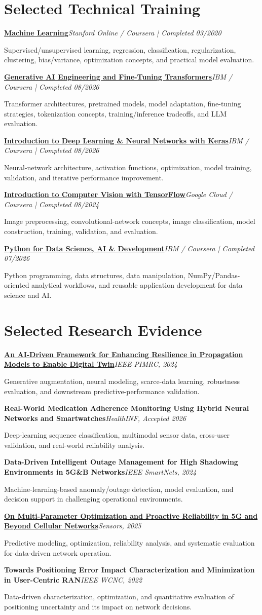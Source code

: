\documentclass[10pt,letterpaper]{extarticle}
\newcommand{\cert}[3]{\Needspace{2\baselineskip}\textbf{#1}\hfill\textit{#2}\par{\small #3\par}}
\newcommand{\pub}[3]{\Needspace{2\baselineskip}\textbf{#1}\hfill\textit{#2}\par{\small #3\par}}
\begin{document}
\section{Selected Technical Training}
\cert{\href{https://www.coursera.org/account/accomplishments/verify/VU3Y5TBLVLZT}{Machine Learning}}{Stanford Online / Coursera | Completed 03/2020}{Supervised/unsupervised learning, regression, classification, regularization, clustering, bias/variance, optimization concepts, and practical model evaluation.}
\cert{\href{https://www.coursera.org/account/accomplishments/verify/SG4GDJ4CLPVL}{Generative AI Engineering and Fine-Tuning Transformers}}{IBM / Coursera | Completed 08/2026}{Transformer architectures, pretrained models, model adaptation, fine-tuning strategies, tokenization concepts, training/inference tradeoffs, and LLM evaluation.}
\cert{\href{https://www.coursera.org/account/accomplishments/verify/Y6NP4GWLS4DZ}{Introduction to Deep Learning \& Neural Networks with Keras}}{IBM / Coursera | Completed 08/2026}{Neural-network architecture, activation functions, optimization, model training, validation, and iterative performance improvement.}
\cert{\href{https://www.coursera.org/account/accomplishments/verify/R6248BNQAC0D}{Introduction to Computer Vision with TensorFlow}}{Google Cloud / Coursera | Completed 08/2024}{Image preprocessing, convolutional-network concepts, image classification, model construction, training, validation, and evaluation.}
\cert{\href{https://www.coursera.org/account/accomplishments/verify/WRA89JEJU8EE}{Python for Data Science, AI \& Development}}{IBM / Coursera | Completed 07/2026}{Python programming, data structures, data manipulation, NumPy/Pandas-oriented analytical workflows, and reusable application development for data science and AI.}

\section{Selected Research Evidence}
\pub{\href{https://doi.org/10.1109/PIMRC59610.2024.10817403}{An AI-Driven Framework for Enhancing Resilience in Propagation Models to Enable Digital Twin}}{IEEE PIMRC, 2024}{Generative augmentation, neural modeling, scarce-data learning, robustness evaluation, and downstream predictive-performance validation.}
\pub{Real-World Medication Adherence Monitoring Using Hybrid Neural Networks and Smartwatches}{HealthINF, Accepted 2026}{Deep-learning sequence classification, multimodal sensor data, cross-user validation, and real-world reliability analysis.}
\pub{Data-Driven Intelligent Outage Management for High Shadowing Environments in 5G\&B Networks}{IEEE SmartNets, 2024}{Machine-learning-based anomaly/outage detection, model evaluation, and decision support in challenging operational environments.}
\pub{\href{https://doi.org/10.3390/s25247651}{On Multi-Parameter Optimization and Proactive Reliability in 5G and Beyond Cellular Networks}}{Sensors, 2025}{Predictive modeling, optimization, reliability analysis, and systematic evaluation for data-driven network operation.}
\pub{Towards Positioning Error Impact Characterization and Minimization in User-Centric RAN}{IEEE WCNC, 2022}{Data-driven characterization, optimization, and quantitative evaluation of positioning uncertainty and its impact on network decisions.}
\end{document}
